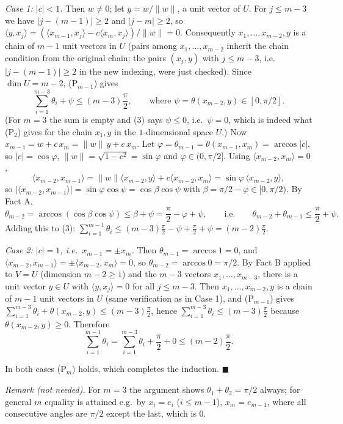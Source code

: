 \documentclass[11pt,a4paper]{article}
\begin{document}
\emph{Case 1: \(|c|<1\).} Then \(w\neq0\); let \(y=w/\|w\|\), a unit
vector of \(U\). For \(j\le m-3\) we have \(|j-(m-1)|\ge2\) and
\(|j-m|\ge2\), so
\(\langle y,x_j\rangle=(\langle x_{m-1},x_j\rangle-c\langle x_m,x_j\rangle)/\|w\|=0\).
Consequently \(x_1,\dots,x_{m-2},y\) is a chain of \(m-1\) unit vectors
in \(U\) (pairs among \(x_1,\dots,x_{m-2}\) inherit the chain condition
from the original chain; the pairs \((x_j,y)\) with \(j\le m-3\),
i.e.~\(|j-(m-1)|\ge2\) in the new indexing, were just checked). Since
\(\dim U=m-2\), (P\(_{m-1}\)) gives
\[\sum_{i=1}^{m-3}\theta_i+\psi\le(m-3)\frac{\pi}{2},\qquad\text{where }\psi=\theta(x_{m-2},y)\in[0,\pi/2].\tag{3}\]
(For \(m=3\) the sum is empty and (3) says \(\psi\le0\),
i.e.~\(\psi=0\), which is indeed what (P\(_2\)) gives for the chain
\(x_1,y\) in the \(1\)-dimensional space \(U\).) Now
\(x_{m-1}=w+c\,x_m=\|w\|\,y+c\,x_m\). Let
\(\varphi=\theta_{m-1}=\theta(x_{m-1},x_m)=\arccos|c|\), so
\(|c|=\cos\varphi\), \(\|w\|=\sqrt{1-c^2}=\sin\varphi\) and
\(\varphi\in(0,\pi/2]\). Using \(\langle x_{m-2},x_m\rangle=0\),
\[\langle x_{m-2},x_{m-1}\rangle=\|w\|\langle x_{m-2},y\rangle+c\langle x_{m-2},x_m\rangle=\sin\varphi\,\langle x_{m-2},y\rangle,\]
so
\(|\langle x_{m-2},x_{m-1}\rangle|=\sin\varphi\cos\psi=\cos\beta\cos\psi\)
with \(\beta=\pi/2-\varphi\in[0,\pi/2)\). By Fact A,
\[\theta_{m-2}=\arccos(\cos\beta\cos\psi)\le\beta+\psi=\frac{\pi}{2}-\varphi+\psi,\qquad\text{i.e.}\qquad \theta_{m-2}+\theta_{m-1}\le\frac{\pi}{2}+\psi.\]
Adding this to (3):
\(\sum_{i=1}^{m-1}\theta_i\le(m-3)\frac{\pi}{2}-\psi+\frac{\pi}{2}+\psi=(m-2)\frac{\pi}{2}\).

\emph{Case 2: \(|c|=1\), i.e.~\(x_{m-1}=\pm x_m\).} Then
\(\theta_{m-1}=\arccos1=0\), and
\(\langle x_{m-2},x_{m-1}\rangle=\pm\langle x_{m-2},x_m\rangle=0\), so
\(\theta_{m-2}=\arccos0=\pi/2\). By Fact B applied to \(V=U\) (dimension
\(m-2\ge1\)) and the \(m-3\) vectors \(x_1,\dots,x_{m-3}\), there is a
unit vector \(y\in U\) with \(\langle y,x_j\rangle=0\) for all
\(j\le m-3\). Then \(x_1,\dots,x_{m-2},y\) is a chain of \(m-1\) unit
vectors in \(U\) (same verification as in Case 1), and (P\(_{m-1}\))
gives
\(\sum_{i=1}^{m-3}\theta_i+\theta(x_{m-2},y)\le(m-3)\frac{\pi}{2}\),
hence \(\sum_{i=1}^{m-3}\theta_i\le(m-3)\frac{\pi}{2}\) because
\(\theta(x_{m-2},y)\ge0\). Therefore
\[\sum_{i=1}^{m-1}\theta_i=\sum_{i=1}^{m-3}\theta_i+\frac{\pi}{2}+0\le(m-2)\frac{\pi}{2}.\]

In both cases (P\(_m\)) holds, which completes the induction.
\(\blacksquare\)

\emph{Remark (not needed).} For \(m=3\) the argument shows
\(\theta_1+\theta_2=\pi/2\) always; for general \(m\) equality is
attained e.g.~by \(x_i=e_i\) (\(i\le m-1\)), \(x_m=e_{m-1}\), where all
consecutive angles are \(\pi/2\) except the last, which is \(0\).
\end{document}
